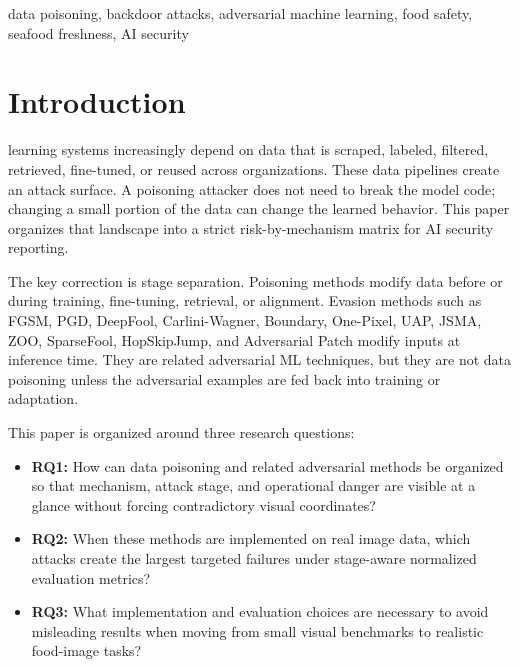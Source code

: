 ﻿\documentclass[6p,10pt,times]{ieeeaccess}
\begin{document}
\begin{keywords}
data poisoning, backdoor attacks, adversarial machine learning, food safety, seafood freshness, AI security
\end{keywords}

\titlepgskip=-15pt

\maketitle
\section{Introduction}
\label{sec:introduction}

 learning systems increasingly depend on data that is scraped, labeled, filtered, retrieved, fine-tuned, or reused across organizations. These data pipelines create an attack surface. A poisoning attacker does not need to break the model code; changing a small portion of the data can change the learned behavior. This paper organizes that landscape into a strict risk-by-mechanism matrix for AI security reporting.

The key correction is stage separation. Poisoning methods modify data before or during training, fine-tuning, retrieval, or alignment. Evasion methods such as FGSM, PGD, DeepFool, Carlini-Wagner, Boundary, One-Pixel, UAP, JSMA, ZOO, SparseFool, HopSkipJump, and Adversarial Patch modify inputs at inference time. They are related adversarial ML techniques, but they are not data poisoning unless the adversarial examples are fed back into training or adaptation.

This paper is organized around three research questions:
\begin{itemize}
    \item \textbf{RQ1:} How can data poisoning and related adversarial methods be organized so that mechanism, attack stage, and operational danger are visible at a glance without forcing contradictory visual coordinates?
    \item \textbf{RQ2:} When these methods are implemented on real image data, which attacks create the largest targeted failures under stage-aware normalized evaluation metrics?
    \item \textbf{RQ3:} What implementation and evaluation choices are necessary to avoid misleading results when moving from small visual benchmarks to realistic food-image tasks?
\end{itemize}
\end{document}
